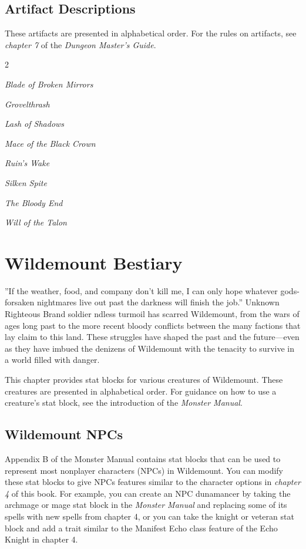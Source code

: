 \documentclass[10pt,a4paper,twoside,bg=print,twocolumn,openany,nodeprecatedcode]{dndbook}
\begin{document}
\section{Artifact Descriptions}
These artifacts are presented in alphabetical order. For the rules on artifacts, see \textit{chapter 7} of the \textit{Dungeon Master's Guide}.


\begin{itemize}
\begin{multicols}{2}
\item \textit{Blade of Broken Mirrors}
\item \textit{Grovelthrash}
\item \textit{Lash of Shadows}
\item \textit{Mace of the Black Crown}
\item \textit{Ruin's Wake}
\item \textit{Silken Spite}
\item \textit{The Bloody End}
\item \textit{Will of the Talon}
\end{multicols}

\end{itemize}

\chapter{Wildemount Bestiary}
\DndQuote%
{}
{''If the weather, food, and company don't kill me, I can only hope whatever gods-forsaken nightmares live out past the darkness will finish the job.''}
{Unknown Righteous Brand soldier}
ndless turmoil has scarred Wildemount, from the wars of ages long past to the more recent bloody conflicts between the many factions that lay claim to this land. These struggles have shaped the past and the future—even as they have imbued the denizens of Wildemount with the tenacity to survive in a world filled with danger.


This chapter provides stat blocks for various creatures of Wildemount. These creatures are presented in alphabetical order. For guidance on how to use a creature's stat block, see the introduction of the \textit{Monster Manual}.

\section{Wildemount NPCs}
Appendix B of the Monster Manual contains stat blocks that can be used to represent most nonplayer characters (NPCs) in Wildemount. You can modify these stat blocks to give NPCs features similar to the character options in \textit{chapter 4} of this book. For example, you can create an NPC dunamancer by taking the archmage or mage stat block in the \textit{Monster Manual} and replacing some of its spells with new spells from chapter 4, or you can take the knight or veteran stat block and add a trait similar to the Manifest Echo class feature of the Echo Knight in chapter 4.
\end{document}
